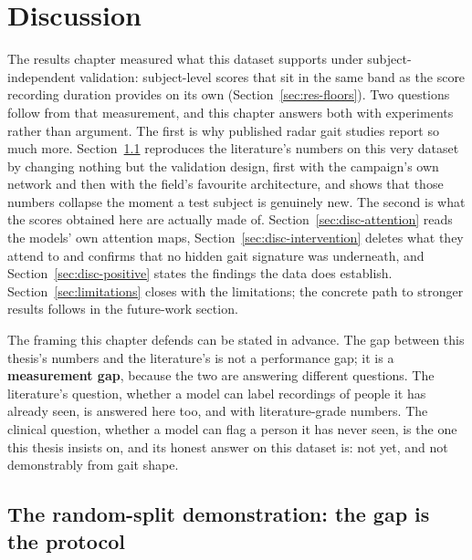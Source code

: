 
\section{Discussion}
\label{sec:discussion}

The results chapter measured what this dataset supports under
subject-independent validation: subject-level scores that sit in the same
band as the score recording duration provides on its own
(Section~\ref{sec:res-floors}). Two questions follow from that measurement,
and this chapter answers both with experiments rather than argument. The
first is why published radar gait studies report so much more.
Section~\ref{sec:disc-protocol} reproduces the literature's numbers on this
very dataset by changing nothing but the validation design, first with the
campaign's own network and then with the field's favourite architecture, and
shows that those numbers collapse the moment a test subject is genuinely
new. The second is what the scores obtained here are actually made of.
Section~\ref{sec:disc-attention} reads the models' own attention maps,
Section~\ref{sec:disc-intervention} deletes what they attend to and confirms
that no hidden gait signature was underneath, and
Section~\ref{sec:disc-positive} states the findings the data does establish.
Section~\ref{sec:limitations} closes with the limitations; the concrete path
to stronger results follows in the future-work section.

The framing this chapter defends can be stated in advance. The gap between
this thesis's numbers and the literature's is not a performance gap; it is a
\textbf{measurement gap}, because the two are answering different questions.
The literature's question, whether a model can label recordings of people it
has already seen, is answered here too, and with literature-grade numbers.
The clinical question, whether a model can flag a person it has never seen,
is the one this thesis insists on, and its honest answer on this dataset is:
not yet, and not demonstrably from gait shape.

\subsection{The random-split demonstration: the gap is the protocol}
\label{sec:disc-protocol}

